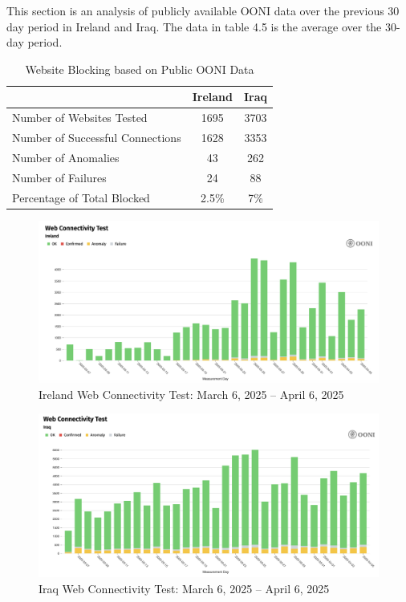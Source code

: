 This section is an analysis of publicly available OONI data over the previous 30 day period in Ireland and Iraq. The data in table 4.5 is the average over the 30-day period.

\vspace{2em}

\begin{table}[H]
\centering
\caption{Website Blocking based on Public OONI Data}
\begin{tabular}{lcc}
\toprule
\textbf{} & \textbf{Ireland} & \textbf{Iraq} \\
\midrule
Number of Websites Tested           & 1695 & 3703 \\
Number of Successful Connections    & 1628 & 3353 \\
Number of Anomalies                 & 43 & 262 \\
Number of Failures                  & 24 & 88 \\
\bottomrule
Percentage of Total Blocked         & 2.5\% & 7\% \\
\end{tabular}
\label{tab:category_block}
\end{table}

\begin{figure}[H]
    \centering
    \includegraphics[width=\textwidth]{Griff/TCD SCSS CAPSTONE/Results/IrelandWebsiteTest.png}
    \caption{Ireland Web Connectivity Test: March 6, 2025 -- April 6, 2025}
    \label{fig:iraq-middlebox-HTTP-manipulation}
\end{figure}

\begin{figure}[H]
    \centering
    \includegraphics[width=\textwidth]{Griff/TCD SCSS CAPSTONE/Results/IraqWebsiteTest.png}
    \caption{Iraq Web Connectivity Test: March 6, 2025 -- April 6, 2025}
    \label{fig:iraq-middlebox-HTTP-manipulation}
\end{figure}

